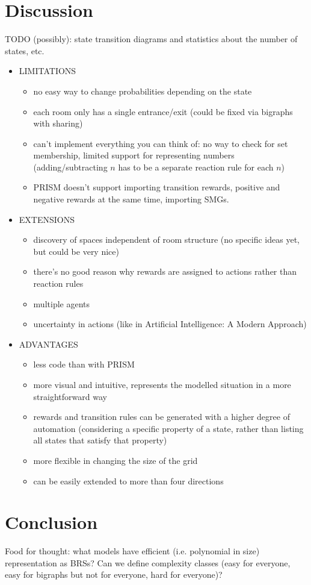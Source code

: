 \documentclass[runningheads]{llncs}
\begin{document}
\section{Discussion}

TODO (possibly): state transition diagrams and statistics about the number of
states, etc.

\begin{itemize}
\item LIMITATIONS
  \begin{itemize}
  \item no easy way to change probabilities depending on the state
  \item each room only has a single entrance/exit (could be fixed via
    bigraphs with sharing)
  \item can't implement everything you can think of: no way to check for set
    membership, limited support for representing numbers (adding/subtracting $n$
    has to be a separate reaction rule for each $n$)
  \item PRISM doesn't support importing transition rewards, positive and
    negative rewards at the same time, importing SMGs.
  \end{itemize}
\item EXTENSIONS
  \begin{itemize}
  \item discovery of spaces independent of room structure (no specific ideas
    yet, but could be very nice)
  \item there's no good reason why rewards are assigned to actions rather than
    reaction rules
  \item multiple agents
  \item uncertainty in actions (like in Artificial Intelligence: A Modern
    Approach)
  \end{itemize}
\item ADVANTAGES
  \begin{itemize}
  \item less code than with PRISM
  \item more visual and intuitive, represents the modelled situation in a more
    straightforward way
  \item rewards and transition rules can be generated with a higher degree of
    automation (considering a specific property of a state, rather than listing
    all states that satisfy that property)
  \item more flexible in changing the size of the grid
  \item can be easily extended to more than four directions
  \end{itemize}
\end{itemize}

\section{Conclusion}

Food for thought: what models have efficient (i.e. polynomial in size)
representation as BRSs? Can we define complexity classes (easy for everyone,
easy for bigraphs but not for everyone, hard for everyone)?



\end{document}
